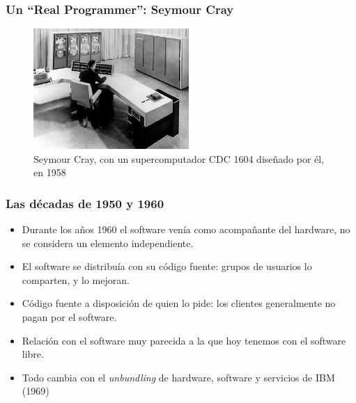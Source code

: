 \documentclass{beamer}
\begin{document}
\begin{frame}
\frametitle{Un ``Real Programmer'': Seymour Cray}


\begin{figure}[h]

\begin{center}
  \includegraphics[height=1.80in]{figs/cray_sm.jpg}
  \caption{{\footnotesize Seymour Cray, con un supercomputador CDC 1604 diseñado por él, en 1958}}
\end{center}
\end{figure}


\end{frame}




\begin{frame}
\frametitle{Las décadas de 1950 y 1960}

\begin{itemize}

\item Durante los años 1960 el software venía como acompañante del hardware, no se considera un elemento independiente.
\item El software se distribuía con su código fuente: grupos de usuarios lo comparten, y lo mejoran.
\item Código fuente a disposición de quien lo pide: los clientes generalmente no pagan por el software. 
\item Relación con el software muy parecida a la que hoy tenemos con el software libre.
\item Todo cambia con el \textit{unbundling} de hardware, software y servicios de IBM (1969)
\end{itemize}

\end{frame}



\end{document}
